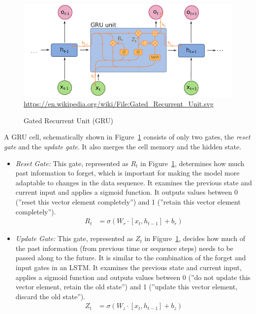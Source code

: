 \begin{figure}
\centering

\includegraphics[width=.85\textwidth]{gru_wikimedia.png}
\scriptsize \url{https://en.wikipedia.org/wiki/File:Gated_Recurrent_Unit.svg} \normalsize
\caption{Gated Recurrent Unit (GRU)}
\label{fig:gru}
\end{figure}

A GRU cell, schematically shown in Figure~\ref{fig:gru} consists of only two gates, the \emph{reset gate} and the \emph{update gate}. It also merges the cell memory and the hidden state.

\begin{itemize}
\item \emph{Reset Gate:} This gate, represented as $R_t$ in Figure~\ref{fig:gru}, determines how much past information to forget, which is important for making the model more adaptable to changes in the data sequence. It examines the previous state and current input and applies a sigmoid function. It outputs values between 0 (''reset this vector element completely'') and 1 (''retain this vector element completely'').
\begin{align}
R_t &= \sigma (W_r \cdot [x_t, h_{t-1}] + b_r) \label{eq:reset}
\end{align}
\item \emph{Update Gate:} This gate, represented as $Z_t$ in Figure~\ref{fig:gru}, decides how much of the past information (from previous time or sequence steps) needs to be passed along to the future. It is similar to the combination of the forget and input gates in an LSTM. It examines the previous state and current input, applies a sigmoid function and outputs values between 0 (''do not update this vector element, retain the old state'') and 1 (''update this vector element, discard the old state''). 
\begin{align}
Z_t &= \sigma (W_z \cdot [x_t, h_{t-1}] + b_z) \label{eq:update}
\end{align}
\end{itemize}

